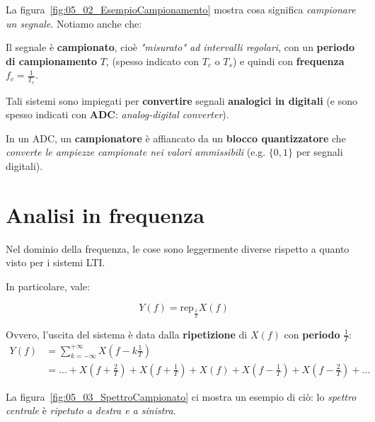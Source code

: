 La figura~\ref{fig:05_02_EsempioCampionamento} mostra cosa significa
\textit{campionare un segnale}. Notiamo anche che:

\begin{definition}
    Il segnale è \textbf{campionato}, cioè \textit{"misurato" ad intervalli regolari},
    con un \textbf{periodo di campionamento} $T$, (spesso indicato con $T_c$ o $T_s$)
    e quindi con \textbf{frequenza} $f_c = \frac{1}{T_c}$.
\end{definition}

\begin{remark}
    Tali sistemi sono impiegati per \textbf{convertire} segnali 
    \textbf{analogici in digitali} (e sono spesso indicati con \textbf{ADC}: 
    \textit{analog-digital converter}).

    In un ADC, un \textbf{campionatore} è affiancato da un \textbf{blocco quantizzatore} 
    che \textit{converte le ampiezze campionate nei valori ammissibili} (e.g. $\{0,1\}$ 
    per segnali digitali).
\end{remark}

\section{Analisi in frequenza}

Nel dominio della frequenza, le cose sono leggermente diverse rispetto a 
quanto visto per i sistemi LTI.

In particolare, vale:

\begin{prop}
    \[
        Y(f) = \text{rep}_{\frac{1}{T}} X(f)
    \] 
\end{prop}

Ovvero, l'uscita del sistema è data dalla \textbf{ripetizione} di $X(f)$
con \textbf{periodo} $\frac{1}{T}$:
\[
    \begin{aligned}
        Y(f) &= \sum_{k=-\infty}^{+\infty} X \left( f - k \frac{1}{T} \right) \\ 
             &= \ldots + X \left( f + \frac{2}{T} \right) + X \left( f + \frac{1}{T} \right) + X(f) 
             + X \left( f - \frac{1}{T} \right) + X \left( f - \frac{2}{T} \right) + \ldots 
    \end{aligned}
\]

La figura~\ref{fig:05_03_SpettroCampionato} ci mostra un esempio di ciò: lo
\textit{spettro centrale} è \textit{ripetuto a destra e a sinistra}.

